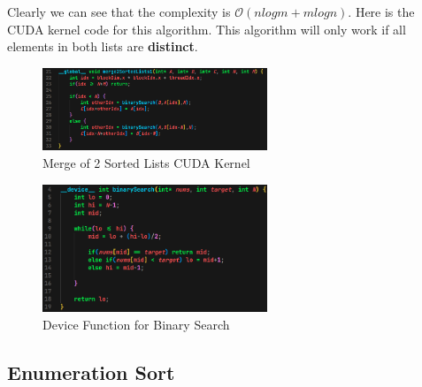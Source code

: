 \documentclass{article}
\begin{document}
Clearly we can see that the complexity is $\mathcal{O}(nlogm + mlogn)$. Here is the CUDA kernel code for this algorithm. This algorithm will only work if all elements in both lists are \textbf{distinct}.

\begin{figure}
    \centering
    \includegraphics[width=0.6\textwidth]{Images/mergeList1.png}
    \caption{Merge of 2 Sorted Lists CUDA Kernel}
\end{figure}

\begin{figure}
    \centering
    \includegraphics[width=0.6\textwidth]{Images/binarySearch.png}
    \caption{Device Function for Binary Search}
\end{figure}

\newpage

\subsection*{Enumeration Sort}
\end{document}
